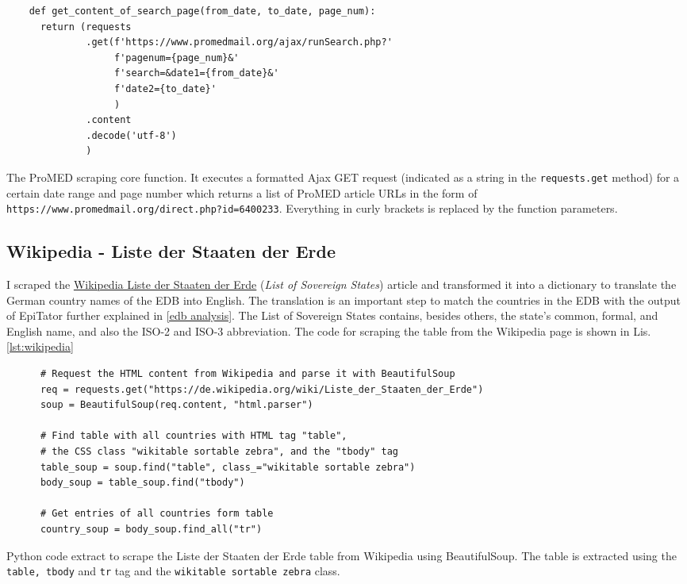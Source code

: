   \begin{listing}[h!]
    \begin{verbatim}
    def get_content_of_search_page(from_date, to_date, page_num):
      return (requests
              .get(f'https://www.promedmail.org/ajax/runSearch.php?'
                   f'pagenum={page_num}&'
                   f'search=&date1={from_date}&'
                   f'date2={to_date}'
                   )
              .content
              .decode('utf-8')
              )
    \end{verbatim}
    \caption{The ProMED scraping core function. It executes a formatted Ajax GET request (indicated as a string in the \texttt{requests.get} method) for a certain date range and page number which returns a list of ProMED article URLs in the form of \textquotesingle \texttt{https://www.promedmail.org/direct.php?id=6400233}\textquotesingle. Everything in curly brackets is replaced by the function parameters.}
    \label{lst:promed}
  \end{listing}

\subsection{Wikipedia - Liste der Staaten der Erde}\label{wikipedia}
  I scraped the \href{https://de.wikipedia.org/wiki/Liste_der_Staaten_der_Erde}{Wikipedia Liste der Staaten der Erde} (\textit{List of Sovereign States}) article and transformed it into a dictionary to translate the German country names of the EDB into English.
  The translation is an important step to match the countries in the EDB with the output of EpiTator further explained in \ref{edb analysis}.
  The List of Sovereign States contains, besides others, the state's common, formal, and English name, and also the ISO-2 and ISO-3 abbreviation.
  The code for scraping the table from the Wikipedia page is shown in Lis. \ref{lst:wikipedia}

  \begin{listing}[h]
    \begin{verbatim}
      # Request the HTML content from Wikipedia and parse it with BeautifulSoup
      req = requests.get("https://de.wikipedia.org/wiki/Liste_der_Staaten_der_Erde")
      soup = BeautifulSoup(req.content, "html.parser")

      # Find table with all countries with HTML tag "table",
      # the CSS class "wikitable sortable zebra", and the "tbody" tag
      table_soup = soup.find("table", class_="wikitable sortable zebra")
      body_soup = table_soup.find("tbody")

      # Get entries of all countries form table
      country_soup = body_soup.find_all("tr")
    \end{verbatim}
    \caption{Python code extract to scrape the Liste der Staaten der Erde table from Wikipedia using BeautifulSoup. The table is extracted using the \texttt{table, tbody} and \texttt{tr} tag and the \texttt{wikitable sortable zebra} class.}
    \label{lst:wikipedia}
  \end{listing}

